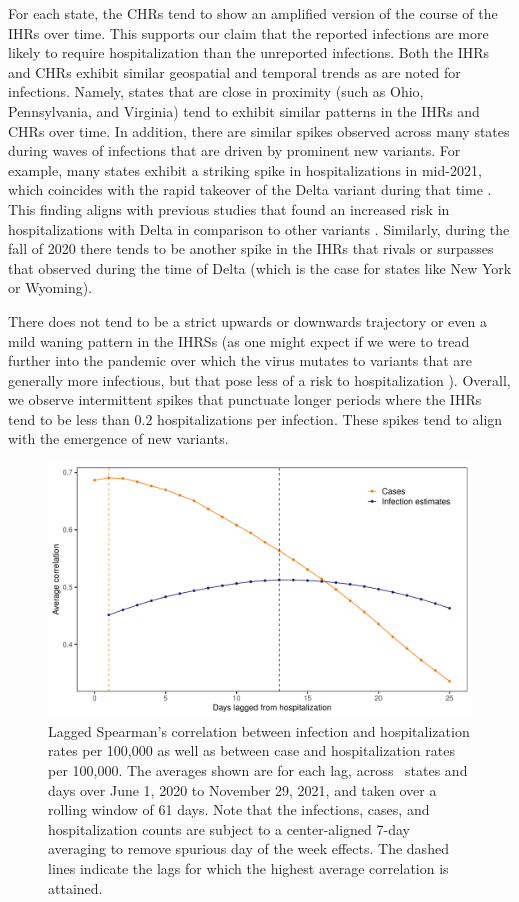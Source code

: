 \documentclass{article}
\begin{document}
For each state, the CHRs tend to show an amplified version of the course of the IHRs over time.
This supports our claim that the reported infections are more likely to require hospitalization
than the unreported infections. Both the IHRs and CHRs exhibit similar geospatial and 
temporal trends as are noted for infections. 
Namely, states that are close in proximity (such as Ohio, Pennsylvania, and Virginia) tend to exhibit similar patterns in
the IHRs and CHRs over time. In addition, there are similar spikes observed across many states during 
waves of infections that are driven by prominent new variants. For example, many
states exhibit a striking spike in hospitalizations in mid-2021, which coincides with the rapid takeover 
of the Delta variant during that time \citep{hodcroft2021covariants}. This finding aligns with 
previous studies that found an increased risk in hospitalizations with Delta in comparison to other
variants \citep{twohig2022hospital, nyberg2022comparative}. Similarly, during the fall of 2020 there tends to be another spike in the IHRs
that rivals or surpasses that observed during the time of Delta (which is the case for states like New York or Wyoming). 

There does not tend to be a strict upwards or downwards trajectory or even a mild waning pattern in the IHRSs (as one might expect if we were to tread further into the pandemic over which the virus mutates to variants that 
are generally more infectious, but that pose less of a risk to hospitalization \citep{lorenzo2022covid, blauer2022compare}). Overall, we observe intermittent spikes that punctuate longer periods where the IHRs tend to be less than $0.2$ hospitalizations per infection. These spikes tend to align with the emergence of new variants.  %

\clearpage
\begin{figure}[!tb]
\centering
    \includegraphics[width=.8\textwidth]{infect_case_hosp_lag_corr_F24.pdf} 
    \caption{Lagged Spearman's correlation between infection and hospitalization
    rates per 100,000 as well as between case and hospitalization rates per
    100,000. The averages shown are for each lag, across \US\ states and days
    over June 1, 2020 to November 29, 2021, and taken over a rolling window of
    61 days. Note that the infections, cases, and hospitalization counts are
    subject to a center-aligned 7-day averaging to remove spurious day of the
    week effects. The dashed lines indicate the lags for which the highest
    average correlation is attained.}
    \label{fig:infect_case_hosp_lag_corr}
\end{figure}
\end{document}
